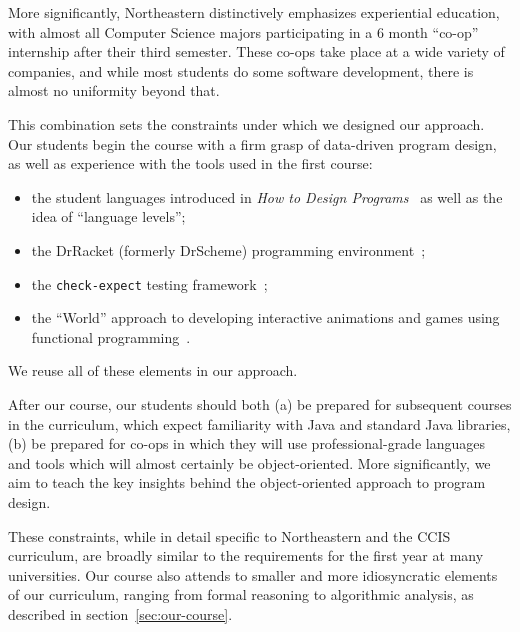 \documentclass[submission,copyright]{eptcs}
\begin{document}
More significantly, Northeastern distinctively emphasizes experiential
education, with almost all Computer Science majors participating in a
6 month ``co-op'' internship after their third semester.  These co-ops
take place at a wide variety of companies, and while most students do
some software development, there is almost no uniformity beyond that. 

This combination sets the constraints under which we designed our
approach.  Our students begin the course with a firm grasp of
data-driven program design, as well as experience with the tools used
in the first course:

\begin{itemize}
  \item the student languages introduced in \emph{How to Design
    Programs}~\cite{dvanhorn:Felleisen2004Structure,
    dvanhorn:Felleisen2001How} as well as the idea of ``language levels'';

  \item the DrRacket (formerly DrScheme) 
    programming environment~\cite{dvanhorn:Findler2002DrScheme};

  \item the \texttt{check-expect} testing framework~\cite{local:check-expect};

  \item the ``World'' approach to developing interactive animations
    and games using functional
    programming~\cite{dvanhorn:Felleisen2009Functional}.
\end{itemize}

\noindent
We reuse all of these elements in our approach.

After our course, our students should both (a) be prepared for
subsequent courses in the curriculum, which expect familiarity with
Java and standard Java libraries, (b) be prepared for co-ops in which
they will use professional-grade languages and tools which will
almost certainly be object-oriented.  More significantly, we aim to
teach the key insights behind the object-oriented approach to program
design.

These constraints, while in detail specific to Northeastern and the
CCIS curriculum, are broadly similar to the requirements for the first
year at many universities.  Our course also attends to smaller and
more idiosyncratic elements of our curriculum, ranging from formal
reasoning to algorithmic analysis, as described in
section~\ref{sec:our-course}.
\end{document}
